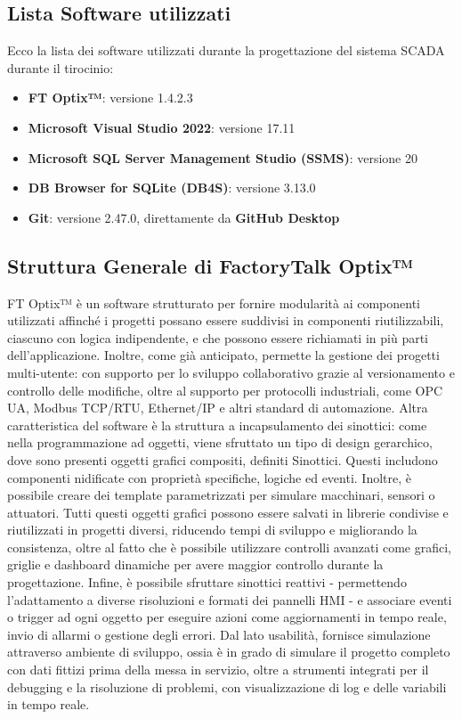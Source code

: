 \subsection{Lista Software utilizzati}
Ecco la lista dei software utilizzati durante la progettazione del sistema SCADA durante il tirocinio:
\begin{itemize}
    \item \textbf{FT Optix™}: versione 1.4.2.3
    \item \textbf{Microsoft Visual Studio 2022}: versione 17.11
    \item \textbf{Microsoft SQL Server Management Studio (SSMS)}: versione 20
    \item \textbf{DB Browser for SQLite (DB4S)}: versione 3.13.0
    \item \textbf{Git}: versione 2.47.0, direttamente da \textbf{GitHub Desktop}
\end{itemize}

\subsection{Struttura Generale di FactoryTalk Optix™}
FT Optix™ è un software strutturato per fornire modularità ai componenti utilizzati affinché i progetti possano essere suddivisi in componenti riutilizzabili, ciascuno con logica indipendente, e che possono essere richiamati in più parti dell'applicazione. Inoltre, come già anticipato, permette la gestione dei progetti multi-utente: con supporto per lo sviluppo collaborativo grazie al versionamento e controllo delle modifiche, oltre al supporto per protocolli industriali, come OPC UA, Modbus TCP/RTU, Ethernet/IP e altri standard di automazione. Altra caratteristica del software è la struttura a incapsulamento dei sinottici: come nella programmazione ad oggetti, viene sfruttato un tipo di design gerarchico, dove sono presenti oggetti grafici compositi, definiti Sinottici. Questi includono componenti nidificate con proprietà specifiche, logiche ed eventi. Inoltre, è possibile creare dei template parametrizzati per simulare macchinari, sensori o attuatori. Tutti questi oggetti grafici possono essere salvati in librerie condivise e riutilizzati in progetti diversi, riducendo tempi di sviluppo e migliorando la consistenza, oltre al fatto che è possibile utilizzare controlli avanzati come grafici, griglie e dashboard dinamiche per avere maggior controllo durante la progettazione. Infine, è possibile sfruttare sinottici reattivi - permettendo l'adattamento a diverse risoluzioni e formati dei pannelli HMI - e associare eventi o trigger ad ogni oggetto per eseguire azioni come aggiornamenti in tempo reale, invio di allarmi o gestione degli errori. Dal lato usabilità, fornisce simulazione attraverso ambiente di sviluppo, ossia è in grado di simulare il progetto completo con dati fittizi prima della messa in servizio, oltre a strumenti integrati per il debugging e la risoluzione di problemi, con visualizzazione di log e delle variabili in tempo reale.

